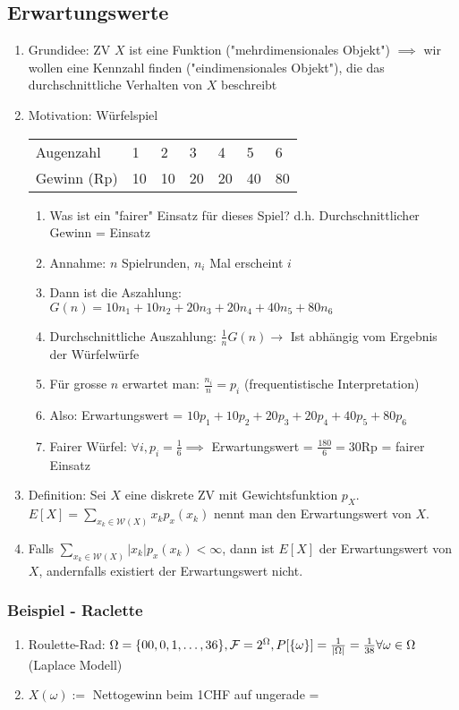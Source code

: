 \documentclass[10pt]{article}
\newcommand{\enumstart}{\begin{enumerate}}
\newcommand{\enumend}{\end{enumerate}}
\newcommand{\F}{\mathcal{F}}
\newcommand{\W}{\mathcal{W}}
\begin{document}
\subsection{Erwartungswerte}
\enumstart
	\item Grundidee: ZV $X$ ist eine Funktion ("mehrdimensionales Objekt") $\implies$ wir wollen eine Kennzahl finden ("eindimensionales Objekt"), die das durchschnittliche Verhalten von $X$ beschreibt
	\item Motivation: Würfelspiel\\
	\begin{tabular}{lllllll}
		Augenzahl & 1 & 2 & 3 & 4 & 5 & 6\\
		Gewinn (Rp) & 10 & 10 & 20 & 20 & 40 & 80\\
	\end{tabular}
	\enumstart
		\item Was ist ein "fairer" Einsatz für dieses Spiel? d.h. Durchschnittlicher Gewinn = Einsatz
		\item Annahme: $n$ Spielrunden, $n_i$ Mal erscheint $i$
		\item Dann ist die Aszahlung: $G(n) = 10n_1 + 10n_2 + 20n_3 + 20n_4 + 40n_5 + 80n_6$
		\item Durchschnittliche Auszahlung: $\frac{1}{n}G(n) \rightarrow$ Ist abhängig vom Ergebnis der Würfelwürfe
		\item Für grosse $n$ erwartet man: $\frac{n_i}{n} = p_i$ (frequentistische Interpretation)
		\item Also: Erwartungswert = $10p_1 + 10p_2 + 20p_3 + 20p_4 + 40p_5 + 80p_6$
		\item Fairer Würfel: $\forall i, p_i = \frac{1}{6} \implies$ Erwartungswert = $\frac{180}{6} = 30$Rp = fairer Einsatz
	\enumend
	\item Definition: Sei $X$ eine diskrete ZV mit Gewichtsfunktion $p_X$. $E[X] = \sum_{x_k \in \W(X)}x_kp_x(x_k)$ nennt man den Erwartungswert von $X$.
	\item Falls $\sum_{x_k \in \W(X)}|x_k|p_x(x_k) < \infty$, dann ist $E[X]$ der Erwartungswert von $X$, andernfalls existiert der Erwartungswert nicht.
\enumend

\subsubsection{Beispiel - Raclette}
\enumstart
	\item Roulette-Rad: $\Omega = \{00,0,1,\mathellipsis, 36\}, \F = 2^\Omega, P[\{\omega\}] = \frac{1}{|\Omega|} = \frac{1}{38} \forall \omega \in \Omega$ (Laplace Modell)
	\item $X(\omega) := $ Nettogewinn beim 1CHF auf ungerade =
	
\enumend
\end{document}
